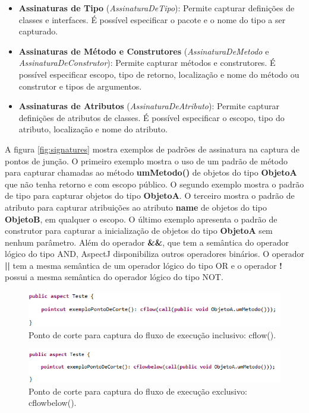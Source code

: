 \begin{itemize}
  \item \textbf{Assinaturas de Tipo} (\textit{AssinaturaDeTipo}): Permite
  capturar definições de classes e interfaces. É possível especificar o pacote e o nome
  do tipo a ser capturado.
  \item \textbf{Assinaturas de Método e Construtores}
  (\textit{AssinaturaDeMetodo} e \textit{AssinaturaDeConstrutor}): Permite
  capturar métodos e construtores. É possível especificar escopo, tipo de retorno, localização e nome do método
  ou construtor e tipos de argumentos.
  \item \textbf{Assinaturas de Atributos} (\textit{AssinaturaDeAtributo}):
  Permite capturar definições de atributos de classes. É possível especificar o escopo, tipo do
  atributo, localização e nome do atributo.
\end{itemize}

A figura \ref{fig:signatures} mostra exemplos de padrões de assinatura na captura de pontos de junção. O primeiro exemplo mostra o uso de um padrão de
método para capturar chamadas ao método \textbf{umMetodo()} de objetos do tipo \textbf{ObjetoA} que não tenha retorno e com escopo público. O segundo
exemplo mostra o padrão de tipo para capturar objetos do tipo \textbf{ObjetoA}. O terceiro mostra o padrão de atributo para capturar atribuições ao
atributo \textbf{name} de objetos do tipo \textbf{ObjetoB}, em qualquer o escopo. O último exemplo apresenta o padrão de construtor para capturar a
inicialização de objetos do tipo \textbf{ObjetoA} sem nenhum parâmetro. Além do operador \textbf{\&\&}, que tem a semântica do operador lógico do tipo
AND, AspectJ disponibiliza outros operadores binários. O operador \textbf{||} tem a mesma semântica de um operador lógico do tipo OR e o operador
\textbf{!} possui a mesma semântica do operador lógico do tipo NOT.

\begin{figure}[!hb]
	\centering
	\includegraphics{img/flow_p1.png}
	\caption{Ponto de corte para captura do fluxo de execução inclusivo: cflow().}\label{fig:flow_p1}
\end{figure}

\begin{figure}[!hb]
	\centering
	\includegraphics{img/flow_p2.png}
	\caption{Ponto de corte para captura do fluxo de execução exclusivo: cflowbelow().}\label{fig:flow_p2}
\end{figure}
 
